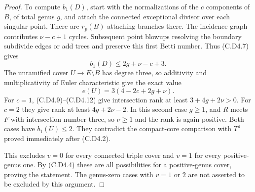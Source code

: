 \begin{proof}
To compute $b_1(D)$, start with the normalizations of the
$c$ components of $B$, of total genus $g$, and attach the
connected exceptional divisor over each singular point.
There are $r_p(B)$ attaching branches there. The incidence
graph contributes $\nu-c+1$ cycles. Subsequent point
blowups resolving the boundary subdivide edges or add trees
and preserve this first Betti number. Thus (C.D4.7) gives
\[
                         b_1(D)\le2g+\nu-c+3.
\tag{C.D4.11}
\]
The unramified cover $U\to E\setminus B$ has degree three,
so additivity and multiplicativity of Euler characteristic
give the exact value
\[
                         e(U)=3(4-2c+2g+\nu).
\tag{C.D4.12}
\]
For $c=1$, (C.D4.9)--(C.D4.12) give intersection rank at
least $3+4g+2\nu>0$. For $c=2$ they give rank at least
$4g+2\nu-2$. In this second case $g\ge1$, and $R$ meets
$F$ with intersection number three, so $\nu\ge1$ and the
rank is again positive. Both cases have $b_1(U)\le2$.
They contradict the compact-core comparison with $T^4$
proved immediately after (C.D4.2).

This excludes $v=0$ for every connected triple cover and
$v=1$ for every positive-genus one. By (C.D4.4) these are
all possibilities for a positive-genus cover, proving the
statement. The genus-zero cases with $v=1$ or $2$ are not
asserted to be excluded by this argument.
\end{proof}

